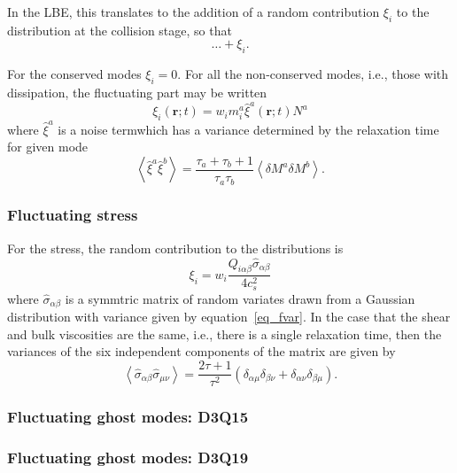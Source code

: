 In the LBE, this translates to the addition of a random contribution
$\xi_i$ to the distribution at the collision stage, so that
\begin{equation}
\ldots + \xi_i.
\end{equation}

For the conserved modes $\xi_i = 0$. For all the non-conserved modes,
i.e., those with dissipation, the fluctuating part may be written
\begin{equation}
\xi_i (\mathbf{r}; t) = w_i m_i^a \hat{\xi}^a (\mathbf{r}; t) N^a
\end{equation}
where $\hat{\xi}^a$ is a noise termwhich has a variance determined
by the relaxation time for given mode
\begin{equation}
\left< \hat{\xi}^a \hat{\xi}^b \right> =
\frac{\tau_a + \tau_b + 1}{\tau_a \tau_b}
\left< \delta M^a \delta M^b \right>.
\label{eq_fvar}
\end{equation}

\subsubsection{Fluctuating stress}

For the stress, the random contribution to the distributions is
\begin{equation}
\xi_i = w_i \frac{Q_{i\alpha\beta} \hat{\sigma}_{\alpha\beta}}{4c_s^2}
\end{equation}
where $\hat{\sigma}_{\alpha\beta}$ is a symmtric matrix of random
variates drawn from a Gaussian distribution with variance given
by equation~\ref{eq_fvar}. In the case that the shear and bulk
viscosities are the same, i.e., there is a single relaxation
time, then the variances of the six independent components of
the matrix are given by
\begin{equation}
\left< \hat{\sigma}_{\alpha\beta} \hat{\sigma}_{\mu\nu} \right> =
\frac{2\tau + 1}{\tau^2}
(\delta_{\alpha\mu}\delta_{\beta\nu} + \delta_{\alpha\nu} \delta_{\beta\mu}).
\end{equation}


\subsubsection{Fluctuating ghost modes: D3Q15}

\subsubsection{Fluctuating ghost modes: D3Q19}



